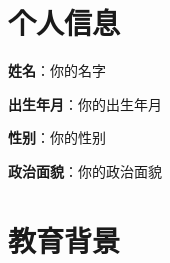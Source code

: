 \documentclass[11pt]{article} %
\newlength{\iconwidth}      %
\begin{document}
    \begin{minipage}[t]{0.78\textwidth} %
        \begin{minipage}[t]{\textwidth} %
        \section[个人信息]{\makebox[\iconwidth][c]{\color{primary_color}{\faAddressCard}}\quad 个人信息}

            \begin{minipage}[t]{0.5\textwidth} %
                \textbf{姓\qquad 名}：你的名字 %

                \vspace{0.5em} %
                \textbf{出生年月}：你的出生年月
            \end{minipage}%
            \begin{minipage}[t]{0.35\textwidth} %
                \textbf{性\qquad 别}：你的性别
                
                \vspace{0.5em}
                \textbf{政治面貌}：你的政治面貌
            \end{minipage}
            \vspace{1.2em} %
        \end{minipage}

        \begin{minipage}[t]{\textwidth}
        \section[教育背景]{\makebox[\iconwidth][c]{\color{primary_color}{\faGraduationCap}}\quad 教育背景}


\end{minipage}
\end{minipage}
\end{document}
